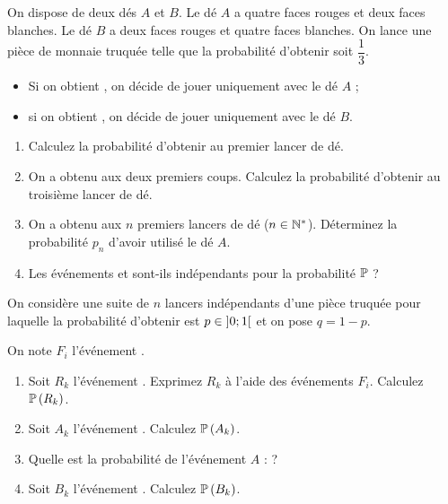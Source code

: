 \begin{exoss}
On dispose de deux dés \(A\) et \(B\). Le dé \(A\) a quatre faces rouges et deux faces blanches. Le dé \(B\) a deux faces rouges et quatre faces blanches. On lance une pièce de monnaie truquée telle que la probabilité d'obtenir  soit \(\dfrac{1}{3}\). \begin{itemize}
    \item Si on obtient , on décide de jouer uniquement avec le dé \(A\) ;
    \item si on obtient , on décide de jouer uniquement avec le dé \(B\).
\end{itemize}

\begin{enumerate}
    \item Calculez la probabilité d'obtenir  au premier lancer de dé. \\
    \item On a obtenu  aux deux premiers coups. Calculez la probabilité d'obtenir  au troisième lancer de dé. \\
    \item On a obtenu  aux \(n\) premiers lancers de dé (\(n\in\mathbb{N}^*\)). Déterminez la probabilité \(p_n\) d'avoir utilisé le dé \(A\). \\
    \item Les événements  et  sont-ils indépendants pour la probabilité \(\mathbb{P}\) ?
\end{enumerate}
\end{exoss}

\begin{exoss}
On considère une suite de \(n\) lancers indépendants d'une pièce truquée pour laquelle la probabilité d'obtenir  est \(p\in\left]0;1\right[\) et on pose \(q=1-p\).

On note \(F_i\) l'événement .

\begin{enumerate}
    \item Soit \(R_k\) l'événement . Exprimez \(R_k\) à l'aide des événements \(F_i\). Calculez \(\mathbb{P}\left(R_k\right)\). \\
    \item Soit \(A_k\) l'événement . Calculez \(\mathbb{P}\left(A_k\right)\). \\
    \item Quelle est la probabilité de l'événement \(A\) :  ? \\
    \item Soit \(B_k\) l'événement . Calculez \(\mathbb{P}\left(B_k\right)\).
\end{enumerate}
\end{exoss}

